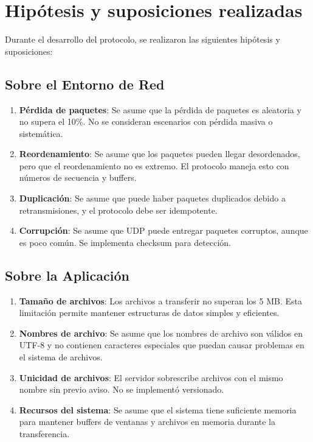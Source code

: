 \section{Hipótesis y suposiciones realizadas}

Durante el desarrollo del protocolo, se realizaron las siguientes hipótesis y suposiciones:

\subsection{Sobre el Entorno de Red}
\begin{enumerate}
    \item \textbf{Pérdida de paquetes}: Se asume que la pérdida de paquetes es aleatoria y no supera el 10\%. No se consideran escenarios con pérdida masiva o sistemática.
    \item \textbf{Reordenamiento}: Se asume que los paquetes pueden llegar desordenados, pero que el reordenamiento no es extremo. El protocolo maneja esto con números de secuencia y buffers.
    \item \textbf{Duplicación}: Se asume que puede haber paquetes duplicados debido a retransmisiones, y el protocolo debe ser idempotente.
    \item \textbf{Corrupción}: Se asume que UDP puede entregar paquetes corruptos, aunque es poco común. Se implementa checksum para detección.
\end{enumerate}

\subsection{Sobre la Aplicación}
\begin{enumerate}
    \item \textbf{Tamaño de archivos}: Los archivos a transferir no superan los 5 MB. Esta limitación permite mantener estructuras de datos simples y eficientes.
    \item \textbf{Nombres de archivo}: Se asume que los nombres de archivo son válidos en UTF-8 y no contienen caracteres especiales que puedan causar problemas en el sistema de archivos.
    \item \textbf{Unicidad de archivos}: El servidor sobrescribe archivos con el mismo nombre sin previo aviso. No se implementó versionado.
    \item \textbf{Recursos del sistema}: Se asume que el sistema tiene suficiente memoria para mantener buffers de ventanas y archivos en memoria durante la transferencia.
\end{enumerate}

